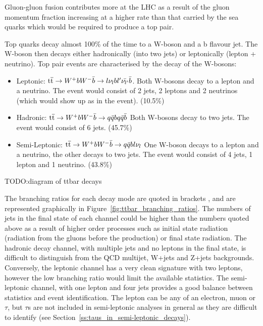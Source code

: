 Gluon-gluon fusion contributes more at the LHC as a result of the gluon momentum fraction increasing at a
higher rate than that carried by the sea quarks which would be required to produce a top pair.


Top quarks decay almost 100\% of the time to a W-boson and a b flavour jet. The W-boson then decays either
hadronically (into two jets) or leptonically (lepton + neutrino). Top pair events are characterised by the
decay of the W-bosons:
\begin{itemize}
  \item Leptonic: $\mathrm{t}\overline{\mathrm{t}} \rightarrow W^{+}bW^{-}\bar{b} \rightarrow l\nu_{l}b l'\bar{\nu_{l'}}\bar{b} $. Both
  W-bosons decay to a lepton and a neutrino. The event would consist of 2 jets, 2 leptons and 2 neutrinos (which would show
  up as \met in the event). (10.5\%)
  \item Hadronic: $\mathrm{t}\overline{\mathrm{t}} \rightarrow W^{+}bW^{-}\bar{b} \rightarrow q\bar{q}b q\bar{q}\bar{b} $ Both
  W-bosons decay to two jets. The event would consist of 6 jets. (45.7\%)
  \item Semi-Leptonic: $\mathrm{t}\overline{\mathrm{t}} \rightarrow W^{+}bW^{-}\bar{b} \rightarrow q\bar{q}b l\nu_{l} $ One W-boson
  decays to a lepton and a neutrino, the other decays to two jets. The event would consist of 4 jets, 1 lepton
  and 1 neutrino. (43.8\%)
\end{itemize}

TODO:diagram of ttbar decays

The branching ratios for each decay mode are quoted in brackets \cite{Agashe:2014kda}, and are represented
graphically in Figure~\ref{fig:ttbar_branching_ratios}. The numbers of jets in the final state of each channel
could be higher than the numbers quoted above as a result of higher order processes such as initial state
radiation (radiation from the gluons before the \ttbar production) or final state radiation. The hadronic
decay channel, with multiple jets and no leptons in the final state, is difficult to distinguish from the QCD
multijet, W+jets and Z+jets backgrounds. Conversely, the leptonic channel has a very clean signature with two
leptons, however the low branching ratio would limit the available statistics. The semi-leptonic channel, with
one lepton and four jets provides a good balance between statistics and event identification. The lepton can
be any of an electron, muon or $\tau$, but $\tau$s are not included in semi-leptonic \tquark analyses in
general as they are difficult to identify (see Section~\ref{ss:taus_in_semi-leptonic_decays}).

